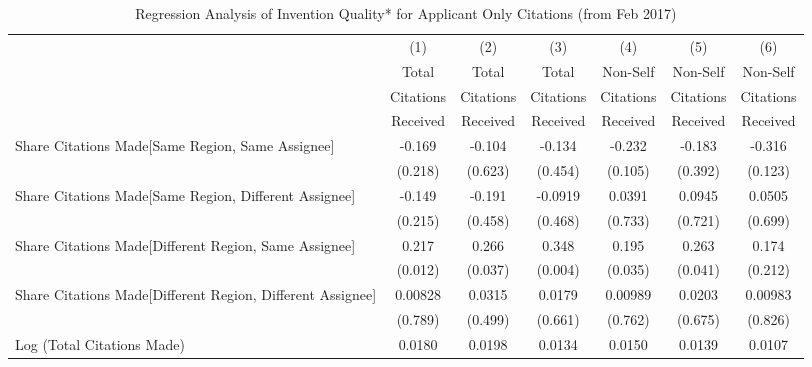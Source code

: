 \documentclass[12pt,letterpaper]{article}
\begin{document}
\begin{table}[htbp]\centering \caption{Regression Analysis of Invention Quality* for Applicant Only Citations (from Feb 2017) \label{ainf.model123192021}}
\scriptsize
\singlespacing
\begin{tabular}{l*{6}{c}} \hline
                &\multicolumn{1}{c}{(1)}&\multicolumn{1}{c}{(2)}&\multicolumn{1}{c}{(3)}&\multicolumn{1}{c}{(4)}&\multicolumn{1}{c}{(5)}&\multicolumn{1}{c}{(6)}\\
                &\multicolumn{1}{c}{Total}&\multicolumn{1}{c}{Total}&\multicolumn{1}{c}{Total}&\multicolumn{1}{c}{Non-Self}&\multicolumn{1}{c}{Non-Self}&\multicolumn{1}{c}{Non-Self}\\
                &\multicolumn{1}{c}{Citations}&\multicolumn{1}{c}{Citations}&\multicolumn{1}{c}{Citations}&\multicolumn{1}{c}{Citations}&\multicolumn{1}{c}{Citations}&\multicolumn{1}{c}{Citations}\\
                 &\multicolumn{1}{c}{Received}&\multicolumn{1}{c}{Received}&\multicolumn{1}{c}{Received}&\multicolumn{1}{c}{Received}&\multicolumn{1}{c}{Received}&\multicolumn{1}{c}{Received}\\
\hline
Share Citations Made[Same Region, Same Assignee]&   -0.169         &   -0.104         &   -0.134&-0.232         &   -0.183         &   -0.316 \\
                &   (0.218)         &  (0.623)         &  (0.454)&   (0.105)         &  (0.392)         &  (0.123) \\
Share Citations Made[Same Region, Different Assignee]&    -0.149         &   -0.191         &  -0.0919&    0.0391         &   0.0945         &   0.0505 \\
                &   (0.215)         &  (0.458)         &  (0.468) &   (0.733)         &  (0.721)         &  (0.699) \\
Share Citations Made[Different Region, Same Assignee]&     0.217  &    0.266  &    0.348&    0.195  &    0.263  &    0.174 \\
                &(0.012)         &  (0.037)         &  (0.004) &   (0.035)         &  (0.041)         &  (0.212)\\
Share Citations Made[Different Region, Different Assignee]&  0.00828         &   0.0315         &   0.0179&   0.00989         &   0.0203         &  0.00983  \\
                &  (0.789)         &  (0.499)         &  (0.661)&    (0.762)         &  (0.675)         &  (0.826)         \\
Log (Total Citations Made)&    0.0180&   0.0198&   0.0134&     0.0150&   0.0139  &   0.0107 \\

\end{tabular}
\end{table}
\end{document}
